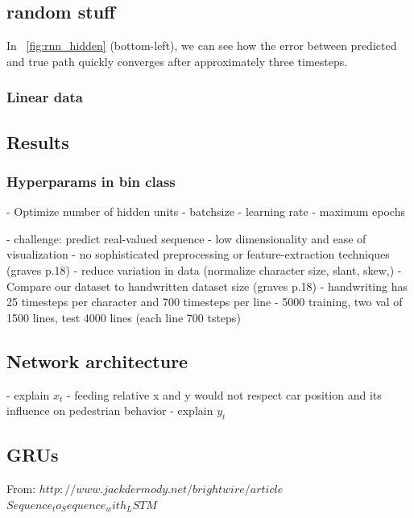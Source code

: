
\subsection{random stuff}


In ~\cref{fig:rnn_hidden} (bottom-left), we can see how the error between predicted and true path quickly converges after approximately three timesteps.

\subsubsection{Linear data}

\subsection{Results}



\subsubsection{Hyperparams in bin class}
- Optimize number of hidden units
- batchsize
- learning rate
- maximum epochs


 


- challenge: predict real-valued sequence
- low dimensionality and ease of visualization
- no sophisticated preprocessing or feature-extraction techniques (graves p.18)
	- reduce variation in data (normalize character size, slant, skew,)
- Compare our dataset to handwritten dataset size (graves p.18)
- handwriting has 25 timesteps per character and 700 timesteps per line
- 5000 training, two val of 1500 lines, test 4000 lines (each line 700 tsteps)

\subsection{Network architecture}
- explain $x_t$
	- feeding relative x and y would not respect car position and its influence on pedestrian behavior
- explain $y_t$

\subsection{GRUs}
From: $http://www.jackdermody.net/brightwire/article$
$Sequence_to_Sequence_with_LSTM$

